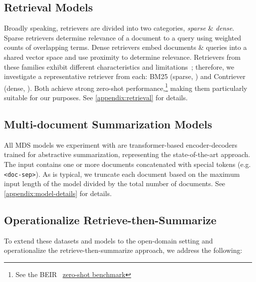 \documentclass[11pt]{article}
\begin{document}
\subsection{Retrieval Models} \label{experimental-setup:retrievers}

Broadly speaking, retrievers are divided into two categories, \textit{sparse} \& \textit{dense}. Sparse retrievers determine relevance of a document to a query using weighted counts of overlapping terms. Dense retrievers embed documents \& queries into a shared vector space and use proximity to determine relevance. Retrievers from these families exhibit different characteristics and limitations~\citep{macavaney-etal-2022-abnirml}; therefore, we investigate a representative retriever from each: BM25 (sparse, \citealp{BM25}) and Contriever (dense, \citealp{contriever}). Both achieve strong zero-shot performance,\footnote{See the BEIR~\citep{BEIR} \href{https://docs.google.com/spreadsheets/d/1L8aACyPaXrL8iEelJLGqlMqXKPX2oSP_R10pZoy77Ns/edit?usp=sharing}{zero-shot benchmark}} making them particularly suitable for our purposes. See \autoref{appendix:retrieval} for details.


\subsection{Multi-document Summarization Models} \label{experimental-setup:summarizers}


All MDS models we experiment with are transformer-based encoder-decoders~\citep{aiayn} trained for abstractive summarization, representing the state-of-the-art approach. The input contains one or more documents concatenated with special tokens (e.g. \texttt{<doc-sep>}). As is typical, we truncate each document based on the maximum input length of the model divided by the total number of documents. See \autoref{appendix:model-details} for details.

\subsection{Operationalize Retrieve-then-Summarize} \label{experimental-setup:operationalizing}

To extend these datasets and models to the open-domain setting and operationalize the retrieve-then-summarize approach, we address the following:
\end{document}
